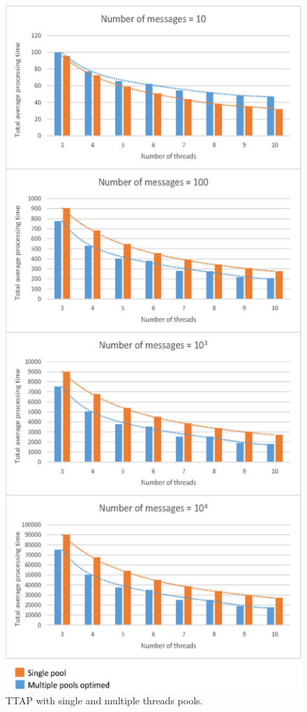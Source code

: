 \begin{figure}[htp]
\centering
\includegraphics[width=1\linewidth]{./figs/comparasion.eps}
\caption{TTAP with single and multiple threads pools.}
\label{fig:comparasion}
\end{figure}

